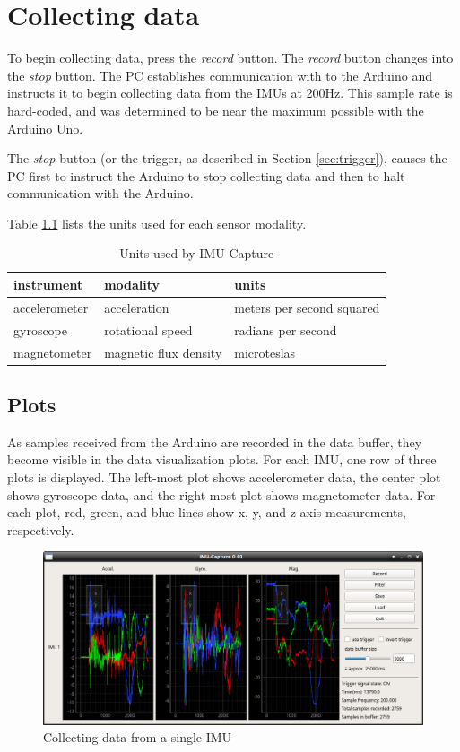 \documentclass[11pt,letterpaper,article,oneside]{memoir}
\newcommand{\name}{IMU-Capture}
\begin{document}
\chapter{Collecting data}

To begin collecting data, press the \emph{record} button.  The \emph{record} button
changes into the \emph{stop} button.  The PC establishes communication with to the
Arduino and instructs it to begin collecting data from the IMUs at 200Hz. This
sample rate is hard-coded, and was determined to be near the maximum possible
with the Arduino Uno.



The \emph{stop} button (or the trigger, as described in Section \ref{sec:trigger}),
causes the PC first to instruct the Arduino to stop collecting data and then to
halt communication with the Arduino.

Table \ref{tab:units} lists the units used for each sensor modality.
\begin{table}
\centering
\begin{tabular}{@{}*3l@{}}
\toprule
instrument & modality & units \\
\midrule 
accelerometer & acceleration          & meters per second squared \\
gyroscope     & rotational speed      & radians per second\\
magnetometer  & magnetic flux density & microteslas \\
\bottomrule
\end{tabular}
\caption{Units used by \name{}}
\label{tab:units}
\end{table}



\section{Plots}
\label{sec:plots}

As samples received from the Arduino are recorded in the data buffer, they
become visible in the data visualization plots. For each IMU, one row of three
plots is displayed. The left-most plot shows accelerometer data, the center plot
shows gyroscope data, and the right-most plot shows magnetometer data. For each
plot, red, green, and blue lines show x, y, and z axis measurements,
respectively.

\begin{figure}[]
    \begin{center}
        \includegraphics[width=\textwidth]{screenshot_plots}
    \end{center}
    \caption{Collecting data from a single IMU} 
\end{figure}
\end{document}
